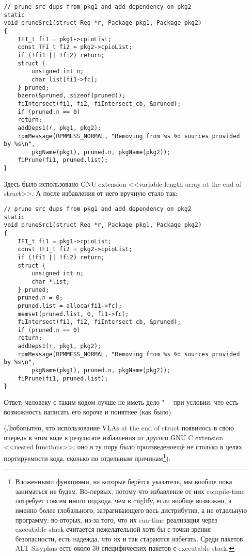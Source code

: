\documentclass[10pt, a5paper]{article}
\begin{document}
\begin{lstlisting}
// prune src dups from pkg1 and add dependency on pkg2
static
void pruneSrc1(struct Req *r, Package pkg1, Package pkg2)
{
    TFI_t fi1 = pkg1->cpioList;
    const TFI_t fi2 = pkg2->cpioList;
    if (!fi1 || !fi2) return;
    struct {
	    unsigned int n;
	    char list[fi1->fc];
    } pruned;
    bzero(&pruned, sizeof(pruned));
    fiIntersect(fi1, fi2, fiIntersect_cb, &pruned);
    if (pruned.n == 0)
	return;
    addDeps1(r, pkg1, pkg2);
    rpmMessage(RPMMESS_NORMAL, "Removing from %s %d sources provided by %s\n",
	    pkgName(pkg1), pruned.n, pkgName(pkg2));
    fiPrune(fi1, pruned.list);
}
\end{lstlisting}

Здесь было использовано GNU extension <<variable-length array at the end of struct>>. А после избавления от него вручную стало так:

\begin{lstlisting}
// prune src dups from pkg1 and add dependency on pkg2
static
void pruneSrc1(struct Req *r, Package pkg1, Package pkg2)
{
    TFI_t fi1 = pkg1->cpioList;
    const TFI_t fi2 = pkg2->cpioList;
    if (!fi1 || !fi2) return;
    struct {
	    unsigned int n;
	    char *list;
    } pruned;
    pruned.n = 0;
    pruned.list = alloca(fi1->fc);
    memset(pruned.list, 0, fi1->fc);
    fiIntersect(fi1, fi2, fiIntersect_cb, &pruned);
    if (pruned.n == 0)
	return;
    addDeps1(r, pkg1, pkg2);
    rpmMessage(RPMMESS_NORMAL, "Removing from %s %d sources provided by %s\n",
	    pkgName(pkg1), pruned.n, pkgName(pkg2));
    fiPrune(fi1, pruned.list);
}
\end{lstlisting}

Ответ: человеку с таким кодом лучше не иметь дело "--- при условии, что есть возможность написать его короче и понятнее (как было).

(Любопытно, что использование VLAs at the end of struct появилось в свою очередь в этом коде в результате избавления от другого GNU C extension <<nested functions>>; оно в ту пору было произведено\footnotemark[1] ещё не столько в целях портируемости кода, сколько по отдельным причинам\footnote{Вложенными функциями, на которые берётся указатель, мы вообще пока заниматься не будем. Во-первых, потому что избавление от них compile-time потребует совсем иного подхода, чем в cuglify, если вообще возможно, а именно более глобального, затрагивающего весь дистрибутив, а не отдельную программу; во-вторых, из-за того, что их run-time реализация через executable stack считается нежелательной хотя бы с точки зрения безопасности, есть надежда, что их и так стараются избегать. Среди пакетов ALT Sisyphus есть около 30 специфических пакетов с executable stack.}).
\end{document}
